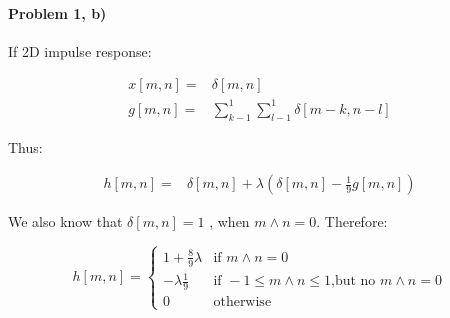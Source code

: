\documentclass[11pt]{article}
\begin{document}
\paragraph{\noindent\textbf{\LARGE{Problem 1, b)}}}  
\begin{flushleft}
    If 2D impulse response:
\end{flushleft} 
\begin{equation*}
\begin{split}
    x[m,n]  = & \delta[m,n] \\
    g[m,n]  = & \sum_{k-1}^1 \sum_{l-1}^1 \delta[m-k, n-l] 
\end{split}
\end{equation*}
\begin{flushleft}
    Thus:
\end{flushleft} 
\begin{equation*}
\begin{split}
    h[m,n] = & \delta[m,n] + \lambda (\delta[m,n] - \frac{1}{9}g[m,n])
\end{split}
\end{equation*}

\begin{flushleft}
    We also know that $\delta[m,n] = 1$ , when $m \wedge n = 0$. Therefore:
\end{flushleft} 
\begin{equation*}
    h[m,n] =
    \begin{cases}
      1 + \frac{8}{9}\lambda & \text{if } m \wedge n = 0 \\
      -\lambda \frac{1}{9} & \text{if }  -1 \leq m \wedge n \leq 1 \text{,but no } m \wedge n = 0\\
      0 & \text{otherwise}
    \end{cases} 
\end{equation*}

\end{document}

